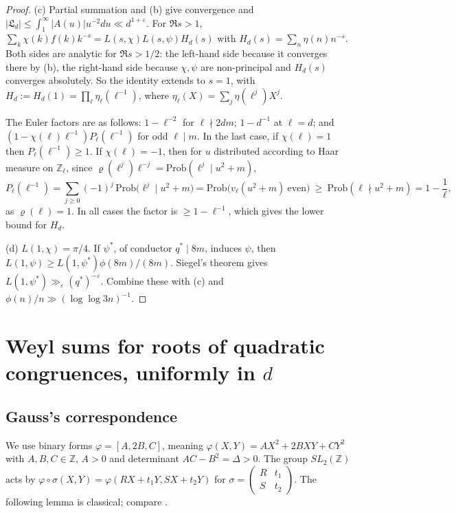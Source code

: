 \documentclass[11pt]{amsart}
\theoremstyle{remark}
\theoremstyle{definition}
\numberwithin{equation}{section}
\newcommand{\Z}{\mathbb{Z}}
\newcommand{\eps}{\varepsilon}
\newcommand{\Lf}{\mathfrak{L}}
\begin{document}
\begin{proof}
(c) Partial summation and (b) give convergence and $|\Lf_d|\le\int_1^\infty|A(u)|u^{-2}du\ll d^{1+\eps}$. For $\Re s>1$, $\sum_k\chi(k)f(k)k^{-s}=L(s,\chi)L(s,\psi)H_d(s)$ with $H_d(s)=\sum_n\eta(n)n^{-s}$. Both sides are analytic for $\Re s>1/2$: the left-hand side because it converges there by (b), the right-hand side because $\chi,\psi$ are non-principal and $H_d(s)$ converges absolutely. So the identity extends to $s=1$, with $H_d:=H_d(1)=\prod_\ell\eta_\ell(\ell^{-1})$, where $\eta_\ell(X)=\sum_j\eta(\ell^j)X^j$.

The Euler factors are as follows: $1-\ell^{-2}$ for $\ell\nmid2dm$; $1-d^{-1}$ at $\ell=d$; and $(1-\chi(\ell)\ell^{-1})P_\ell(\ell^{-1})$ for odd $\ell\mid m$. In the last case, if $\chi(\ell)=1$ then $P_\ell(\ell^{-1})\ge1$. If $\chi(\ell)=-1$, then for $u$ distributed according to Haar measure on $\Z_\ell$, since $\varrho(\ell^j)\ell^{-j}=\mathrm{Prob}(\ell^j\mid u^2+m)$,
\[
P_\ell(\ell^{-1})=\sum_{j\ge0}(-1)^j\,\mathrm{Prob}\bigl(\ell^j\mid u^2+m\bigr)=\mathrm{Prob}\bigl(v_\ell(u^2+m)\ \text{even}\bigr)\ \ge\ \mathrm{Prob}(\ell\nmid u^2+m)=1-\frac1\ell,
\]
as $\varrho(\ell)=1$. In all cases the factor is $\ge1-\ell^{-1}$, which gives the lower bound for $H_d$.

(d) $L(1,\chi)=\pi/4$. If $\psi^*$, of conductor $q^*\mid8m$, induces $\psi$, then $L(1,\psi)\ge L(1,\psi^*)\phi(8m)/(8m)$. Siegel's theorem \cite[Ch.~21]{Da} gives $L(1,\psi^*)\gg_\eps(q^*)^{-\eps}$. Combine these with (c) and $\phi(n)/n\gg(\log\log 3n)^{-1}$.
\end{proof}

\section{\texorpdfstring{Weyl sums for roots of quadratic congruences, uniformly in $d$}{Weyl sums for roots of quadratic congruences, uniformly in d}}\label{sec:weyl}

\subsection{Gauss's correspondence}
We use binary forms $\varphi=[A,2B,C]$, meaning $\varphi(X,Y)=AX^2+2BXY+CY^2$ with $A,B,C\in\Z$, $A>0$ and determinant $AC-B^2=\Delta>0$. The group $SL_2(\Z)$ acts by $\varphi\circ\sigma(X,Y)=\varphi(RX+t_1Y,SX+t_2Y)$ for $\sigma=\left(\begin{smallmatrix}R&t_1\\ S&t_2\end{smallmatrix}\right)$. The following lemma is classical; compare \cite[Lemma~5 and its Corollary]{FI78}.
\end{document}
